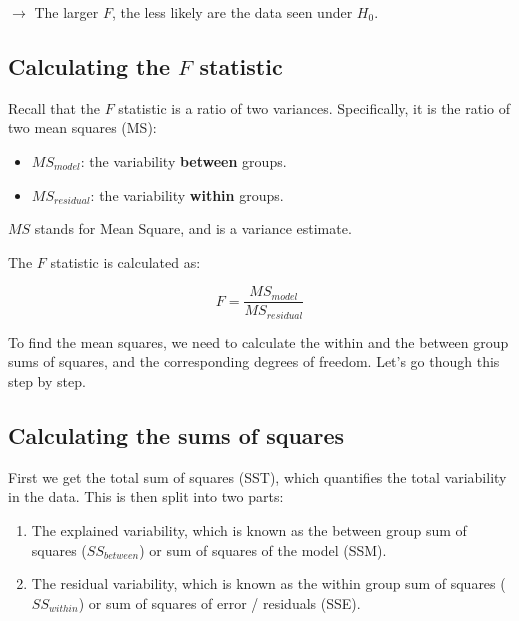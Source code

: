 \documentclass[
  letterpaper,
  8pt,
  a4paper]{book}
\providecommand{\tightlist}{%
  \setlength{\itemsep}{0pt}\setlength{\parskip}{0pt}}
\begin{document}
\(\rightarrow\) The larger \(F\), the less likely are the data seen
under \(H_0\).

\subsection*{\texorpdfstring{Calculating the \(F\)
statistic}{Calculating the F statistic}}\label{calculating-the-f-statistic}

Recall that the \(F\) statistic is a ratio of two variances.
Specifically, it is the ratio of two mean squares (MS):

\begin{itemize}
\tightlist
\item
  \(MS_{model}\): the variability \textbf{between} groups.
\item
  \(MS_{residual}\): the variability \textbf{within} groups.
\end{itemize}

\(MS\) stands for Mean Square, and is a variance estimate.

The \(F\) statistic is calculated as:

\[F = \frac{MS_{model}}{MS_{residual}}\]

To find the mean squares, we need to calculate the within and the
between group sums of squares, and the corresponding degrees of freedom.
Let's go though this step by step.

\subsection*{Calculating the sums of
squares}\label{calculating-the-sums-of-squares}

First we get the total sum of squares (SST), which quantifies the total
variability in the data. This is then split into two parts:

\begin{enumerate}
\def\labelenumi{\arabic{enumi}.}
\tightlist
\item
  The explained variability, which is known as the between group sum of
  squares (\(SS_{between}\)) or sum of squares of the model (SSM).
\item
  The residual variability, which is known as the within group sum of
  squares (\(SS_{within}\)) or sum of squares of error / residuals
  (SSE).
\end{enumerate}
\end{document}
